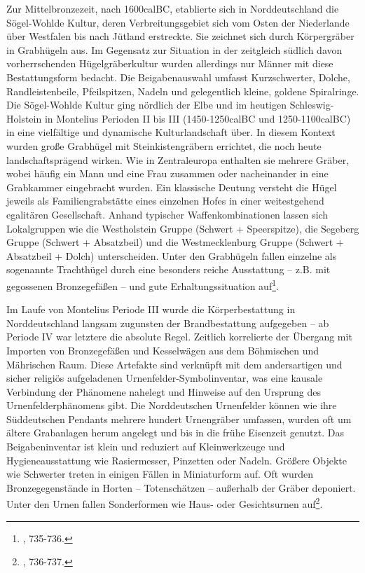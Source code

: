 \documentclass[openany,twoside,twocolumn]{book}
\let\rmarkdownfootnote\footnote%
\def\footnote{\protect\rmarkdownfootnote}
\begin{document}
Zur Mittelbronzezeit, nach 1600calBC, etablierte sich in Norddeutschland
die Sögel-Wohlde Kultur, deren Verbreitungsgebiet sich vom Osten der
Niederlande über Westfalen bis nach Jütland erstreckte. Sie zeichnet
sich durch Körpergräber in Grabhügeln aus. Im Gegensatz zur Situation in
der zeitgleich südlich davon vorherrschenden Hügelgräberkultur wurden
allerdings nur Männer mit diese Bestattungsform bedacht. Die
Beigabenauswahl umfasst Kurzschwerter, Dolche, Randleistenbeile,
Pfeilspitzen, Nadeln und gelegentlich kleine, goldene Spiralringe. Die
Sögel-Wohlde Kultur ging nördlich der Elbe und im heutigen
Schleswig-Holstein in Montelius Perioden II bis III (1450-1250calBC und
1250-1100calBC) in eine vielfältige und dynamische Kulturlandschaft
über. In diesem Kontext wurden große Grabhügel mit Steinkistengräbern
errichtet, die noch heute landschaftsprägend wirken. Wie in
Zentraleuropa enthalten sie mehrere Gräber, wobei häufig ein Mann und
eine Frau zusammen oder nacheinander in eine Grabkammer eingebracht
wurden. Ein klassische Deutung versteht die Hügel jeweils als
Familiengrabstätte eines einzelnen Hofes in einer weitestgehend
egalitären Gesellschaft. Anhand typischer Waffenkombinationen lassen
sich Lokalgruppen wie die Westholstein Gruppe (Schwert + Speerspitze),
die Segeberg Gruppe (Schwert + Absatzbeil) und die Westmecklenburg
Gruppe (Schwert + Absatzbeil + Dolch) unterscheiden. Unter den
Grabhügeln fallen einzelne als sogenannte Trachthügel durch eine
besonders reiche Ausstattung -- z.B. mit gegossenen Bronzegefäßen -- und
gute Erhaltungssituation auf\footnote{\textcite{jockenhovel_germany_2013},
  735-736.}.

Im Laufe von Montelius Periode III wurde die Körperbestattung in
Norddeutschland langsam zugunsten der Brandbestattung aufgegeben -- ab
Periode IV war letztere die absolute Regel. Zeitlich korrelierte der
Übergang mit Importen von Bronzegefäßen und Kesselwägen aus dem
Böhmischen und Mährischen Raum. Diese Artefakte sind verknüpft mit dem
andersartigen und sicher religiös aufgeladenen
Urnenfelder-Symbolinventar, was eine kausale Verbindung der Phänomene
nahelegt und Hinweise auf den Ursprung des Urnenfelderphänomens gibt.
Die Norddeutschen Urnenfelder können wie ihre Süddeutschen Pendants
mehrere hundert Urnengräber umfassen, wurden oft um ältere Grabanlagen
herum angelegt und bis in die frühe Eisenzeit genutzt. Das
Beigabeninventar ist klein und reduziert auf Kleinwerkzeuge und
Hygieneausstattung wie Rasiermesser, Pinzetten oder Nadeln. Größere
Objekte wie Schwerter treten in einigen Fällen in Miniaturform auf. Oft
wurden Bronzegegenstände in Horten -- Totenschätzen -- außerhalb der
Gräber deponiert. Unter den Urnen fallen Sonderformen wie Haus- oder
Gesichtsurnen auf\footnote{\textcite{jockenhovel_germany_2013}, 736-737.}.
\end{document}
